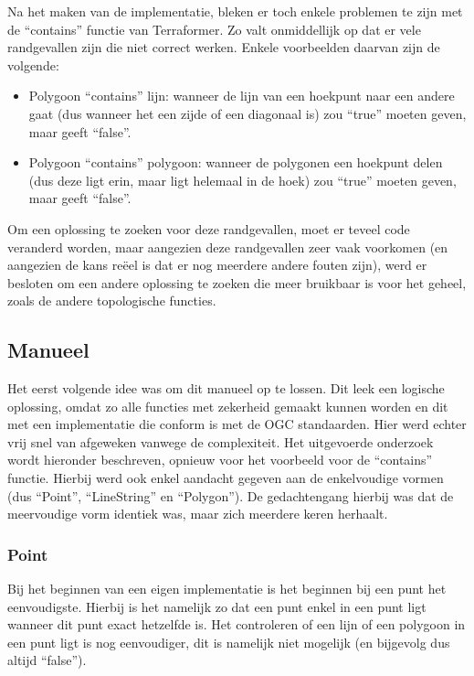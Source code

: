 Na het maken van de implementatie, bleken er toch enkele problemen te zijn met de ``contains'' functie van Terraformer. Zo valt onmiddellijk op dat er vele randgevallen zijn die niet correct werken. Enkele voorbeelden daarvan zijn de volgende:
\begin{itemize}
    \item Polygoon ``contains'' lijn: wanneer de lijn van een hoekpunt naar een andere gaat (dus wanneer het een zijde of een diagonaal is) zou ``true'' moeten geven, maar geeft ``false''.
    \item Polygoon ``contains'' polygoon: wanneer de polygonen een hoekpunt delen (dus deze ligt erin, maar ligt helemaal in de hoek) zou ``true'' moeten geven, maar geeft ``false''.
\end{itemize}

Om een oplossing te zoeken voor deze randgevallen, moet er teveel code veranderd worden, maar aangezien deze randgevallen zeer vaak voorkomen (en aangezien de kans reëel is dat er nog meerdere andere fouten zijn), werd er besloten om een andere oplossing te zoeken die meer bruikbaar is voor het geheel, zoals de andere topologische functies.

\subsection{Manueel}
Het eerst volgende idee was om dit manueel op te lossen. Dit leek een logische oplossing, omdat zo alle functies met zekerheid gemaakt kunnen worden en dit met een implementatie die conform is met de OGC standaarden. Hier werd echter vrij snel van afgeweken vanwege de complexiteit. Het uitgevoerde onderzoek wordt hieronder beschreven, opnieuw voor het voorbeeld voor de ``contains'' functie. Hierbij werd ook enkel aandacht gegeven aan de enkelvoudige vormen (dus ``Point'', ``LineString'' en ``Polygon''). De gedachtengang hierbij was dat de meervoudige vorm identiek was, maar zich meerdere keren herhaalt.

\subsubsection{Point}
Bij het beginnen van een eigen implementatie is het beginnen bij een punt het eenvoudigste. Hierbij is het namelijk zo dat een punt enkel in een punt ligt wanneer dit punt exact hetzelfde is. Het controleren of een lijn of een polygoon in een punt ligt is nog eenvoudiger, dit is namelijk niet mogelijk (en bijgevolg dus altijd ``false'').  

